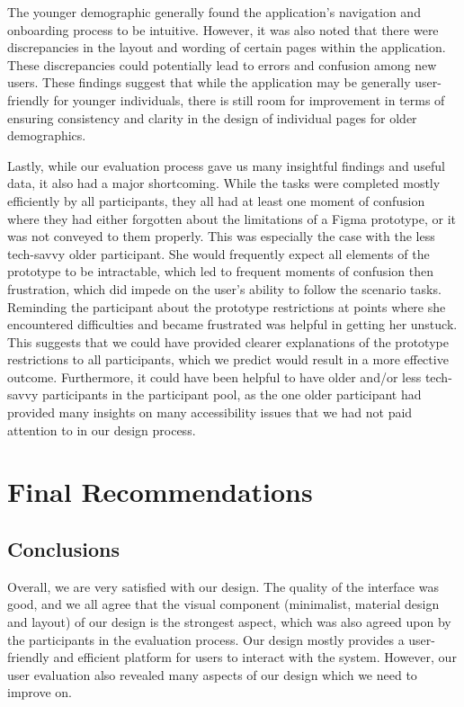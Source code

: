 \documentclass[manuscript, screen, nonacm]{acmart}
\begin{document}
The younger demographic generally found the application's navigation and onboarding process to be intuitive. However, it was also noted that there were discrepancies in the layout and wording of certain pages within the application. These discrepancies could potentially lead to errors and confusion among new users. These findings suggest that while the application may be generally user-friendly for younger individuals, there is still room for improvement in terms of ensuring consistency and clarity in the design of individual pages for older demographics.

Lastly, while our evaluation process gave us many insightful findings and useful data, it also had a major shortcoming. While the tasks were completed mostly efficiently by all participants, they all had at least one moment of confusion where they had either forgotten about the limitations of a Figma prototype, or it was not conveyed to them properly. This was especially the case with the less tech-savvy older participant. She would frequently expect all elements of the prototype to be intractable, which led to frequent moments of confusion then frustration, which did impede on the user’s ability to follow the scenario tasks. Reminding the participant about the prototype restrictions at points where she encountered difficulties and became frustrated was helpful in getting her unstuck. This suggests that we could have provided clearer explanations of the prototype restrictions to all participants, which we predict would result in a more effective outcome. Furthermore, it could have been helpful to have older and/or less tech-savvy participants in the participant pool, as the one older participant had provided many insights on many accessibility issues that we had not paid attention to in our design process.


\section{Final Recommendations}

\subsection{Conclusions}

Overall, we are very satisfied with our design. The quality of the interface was good, and we all agree that the visual component (minimalist, material design and layout) of our design is the strongest aspect, which was also agreed upon by the participants in the evaluation process. Our design mostly provides a user-friendly and efficient platform for users to interact with the system. However, our user evaluation also revealed many aspects of our design which we need to improve on.
\end{document}
